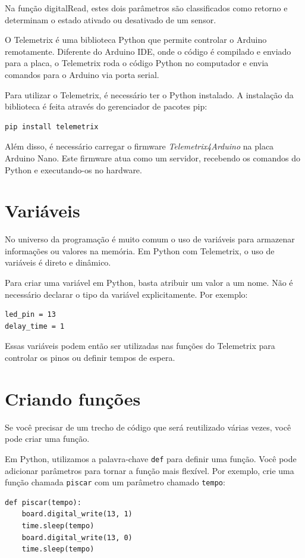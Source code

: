 \documentclass[lang=pt,11pt]{elegantbook}
\begin{document}
Na função digitalRead, estes dois parâmetros são classificados como retorno e determinam o estado ativado ou desativado de um sensor.

O Telemetrix é uma biblioteca Python que permite controlar o Arduino remotamente. Diferente do Arduino IDE, onde o código é compilado e enviado para a placa, o Telemetrix roda o código Python no computador e envia comandos para o Arduino via porta serial.

Para utilizar o Telemetrix, é necessário ter o Python instalado. A instalação da biblioteca é feita através do gerenciador de pacotes pip:
\begin{lstlisting}
pip install telemetrix
\end{lstlisting}

Além disso, é necessário carregar o firmware \textit{Telemetrix4Arduino} na placa Arduino Nano. Este firmware atua como um servidor, recebendo os comandos do Python e executando-os no hardware.

\section{Variáveis}

No universo da programação é muito comum o uso de variáveis para armazenar informações ou valores na memória. Em Python com Telemetrix, o uso de variáveis é direto e dinâmico.

Para criar uma variável em Python, basta atribuir um valor a um nome. Não é necessário declarar o tipo da variável explicitamente. Por exemplo:
\begin{lstlisting}
led_pin = 13
delay_time = 1
\end{lstlisting}
Essas variáveis podem então ser utilizadas nas funções do Telemetrix para controlar os pinos ou definir tempos de espera.

\section{Criando funções}

Se você precisar de um trecho de código que será reutilizado várias vezes, você pode criar uma função.

Em Python, utilizamos a palavra-chave \lstinline{def} para definir uma função. Você pode adicionar parâmetros para tornar a função mais flexível. Por exemplo, crie uma função chamada \lstinline{piscar} com um parâmetro chamado \lstinline{tempo}:

\begin{lstlisting}
def piscar(tempo):
    board.digital_write(13, 1)
    time.sleep(tempo)
    board.digital_write(13, 0)
    time.sleep(tempo)
\end{lstlisting}
\end{document}
